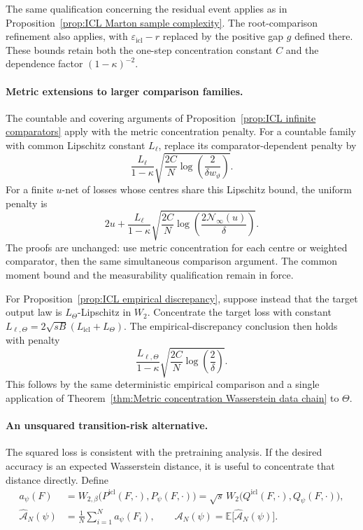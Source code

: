 The same qualification concerning the residual event applies as in Proposition~\ref{prop:ICL Marton sample complexity}. The root-comparison refinement also applies, with \(\varepsilon_{\mathrm{icl}}-r\) replaced by the positive gap \(g\) defined there. These bounds retain both the one-step concentration constant \(C\) and the dependence factor \((1-\kappa)^{-2}\).

\paragraph{Metric extensions to larger comparison families.}

The countable and covering arguments of Proposition~\ref{prop:ICL infinite comparators} apply with the metric concentration penalty. For a countable family with common Lipschitz constant \(L_\ell\), replace its comparator-dependent penalty by
\[
\frac{L_\ell}{1-\kappa}\sqrt{\frac{2C}{N}\log\left(\frac{2}{\delta w_\vartheta}\right)}.
\]
For a finite \(u\)-net of losses whose centres share this Lipschitz bound, the uniform penalty is
\[
2u+\frac{L_\ell}{1-\kappa}
\sqrt{\frac{2C}{N}\log\left(\frac{2\mathcal N_\infty(u)}{\delta}\right)}.
\]
The proofs are unchanged: use metric concentration for each centre or weighted comparator, then the same simultaneous comparison argument. The common moment bound and the measurability qualification remain in force.

For Proposition~\ref{prop:ICL empirical discrepancy}, suppose instead that the target output law is \(L_\Theta\)-Lipschitz in \(W_2\). Concentrate the target loss with constant
\(L_{\ell,\Theta}=2\sqrt{sB}(L_{\mathrm{icl}}+L_\Theta)\).
The empirical-discrepancy conclusion then holds with penalty
\[
\frac{L_{\ell,\Theta}}{1-\kappa}
\sqrt{\frac{2C}{N}\log\left(\frac2\delta\right)}.
\]
This follows by the same deterministic empirical comparison and a single application of Theorem~\ref{thm:Metric concentration Wasserstein data chain} to \(\Theta\).

\paragraph{An unsquared transition-risk alternative.}

The squared loss is consistent with the pretraining analysis. If the desired accuracy is an expected Wasserstein distance, it is useful to concentrate that distance directly. Define
\begin{align}
a_\psi(F)&=W_{2,\beta}\bigl(P^{\mathrm{icl}}(F,\cdot),P_\psi(F,\cdot)\bigr)
=\sqrt s\,W_2\bigl(Q^{\mathrm{icl}}(F,\cdot),Q_\psi(F,\cdot)\bigr),\nonumber\\
\widehat{\mathcal A}_N(\psi)&=\frac1N\sum_{i=1}^Na_\psi(F_i),
\qquad
\mathcal A_N(\psi)=\mathbb E\bigl[\widehat{\mathcal A}_N(\psi)\bigr].
\label{eq:ICL unsquared risks}
\end{align}


